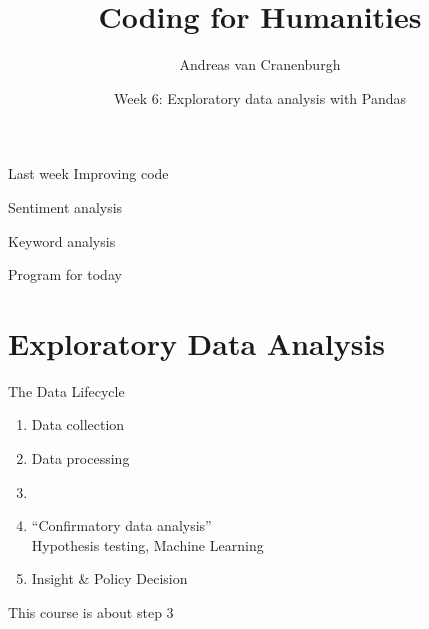 \documentclass[aspectratio=169,usenames,dvipsnames]{beamer}
\title{Coding for Humanities}
\author{Andreas van Cranenburgh}
\date{Week 6: Exploratory data analysis with Pandas}
\begin{document}
\maketitle


\begin{frame}{Last week}
    Improving code

    \vspace{1em}
    Sentiment analysis

    \vspace{1em}
    Keyword analysis
\end{frame}

\begin{frame}{Program for today}
\tableofcontents
\end{frame}



\section{Exploratory Data Analysis}
\frame{\tableofcontents[currentsection]}

\begin{frame}{The Data Lifecycle}
    \begin{enumerate}
        \item Data collection
        \item Data processing
        \item {}
        \item ``Confirmatory data analysis'' \\
            Hypothesis testing, Machine Learning
        \item Insight \& Policy Decision
    \end{enumerate}

    \vspace{1em}
    This course is about step 3
\end{frame}
\end{document}
